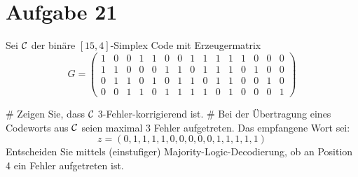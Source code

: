 \section*{Aufgabe 21}
Sei $\mathcal{C}$ der binäre $[15,4]$-Simplex Code mit Erzeugermatrix
\begin{equation*}
	G = 
	\begin{pmatrix}
	1 & 0 & 0 & 1 & 1 & 0 & 0 & 1 & 1 & 1 & 1 & 1 & 0 & 0 & 0 \\
	1 & 1 & 0 & 0 & 0 & 1 & 1 & 0 & 1 & 1 & 1 & 0 & 1 & 0 & 0 \\
	0 & 1 & 1 & 0 & 1 & 0 & 1 & 1 & 0 & 1 & 1 & 0 & 0 & 1 & 0 \\
	0 & 0 & 1 & 1 & 0 & 1 & 1 & 1 & 1 & 0 & 1 & 0 & 0 & 0 & 1
	\end{pmatrix}
\end{equation*}
\begin{myList}
#
Zeigen Sie, dass $\mathcal{C}$ 3-Fehler-korrigierend ist.
#
Bei der Übertragung eines Codeworts aus $\mathcal{C}$ seien maximal 3 Fehler aufgetreten. Das empfangene Wort sei:
\begin{equation*}
	z = (0,1,1,1,1,0,0,0,0,0,1,1,1,1,1)
\end{equation*}
Entscheiden Sie mittels (einstufiger) Majority-Logic-Decodierung, ob an Position 4 ein Fehler aufgetreten ist.
\end{myList}

